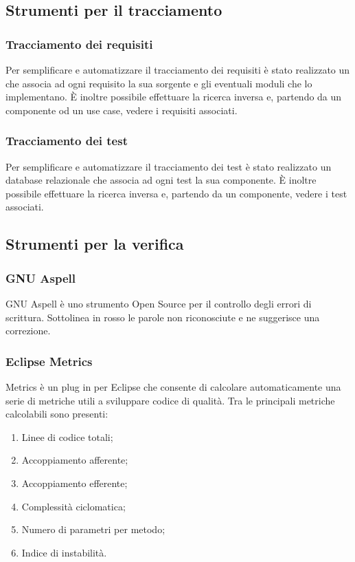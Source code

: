 \subsection{Strumenti per il tracciamento}

\subsubsection{Tracciamento dei requisiti}
\label{}
Per semplificare e automatizzare il tracciamento dei requisiti è stato realizzato un   che associa ad ogni requisito la sua sorgente e gli eventuali moduli che lo implementano. È inoltre possibile effettuare la ricerca inversa e, partendo da un componente od un use case, vedere i requisiti associati.

\subsubsection{Tracciamento dei test}
\label{}
Per semplificare e automatizzare il tracciamento dei test è stato realizzato un database relazionale che associa ad ogni test la sua componente. È inoltre possibile effettuare la ricerca inversa e, partendo da un componente, vedere i test associati.

\subsection{Strumenti per la verifica}

\subsubsection{GNU Aspell}
GNU Aspell è uno strumento Open Source per il controllo degli errori di scrittura. Sottolinea in rosso le parole non riconosciute e ne suggerisce una correzione.
\subsubsection{Eclipse Metrics}
Metrics è un plug in per Eclipse che consente di calcolare automaticamente una serie di metriche utili a sviluppare codice di qualità.
Tra le principali metriche calcolabili sono presenti:
\begin{enumerate}
\item Linee di codice totali;
\item Accoppiamento afferente;
\item Accoppiamento efferente;
\item Complessità ciclomatica;
\item Numero di parametri per metodo;
\item Indice di instabilità.
\end{enumerate}

